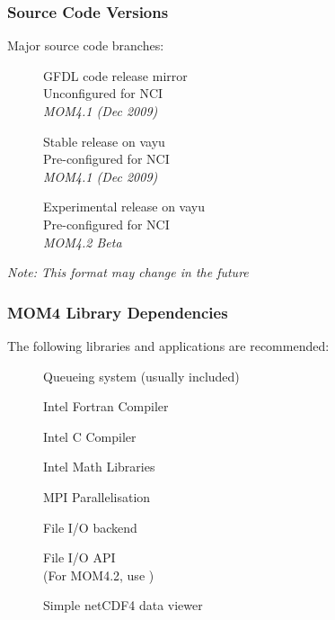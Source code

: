 \documentclass{beamer}
\begin{document}
\begin{frame}[fragile]
    \frametitle{Source Code Versions}
    
    Major source code branches:
    \begin{description}
        \item[] GFDL code release mirror\\
                                     Unconfigured for NCI\\
                                     \textit{MOM4.1 (Dec 2009)}
        \item[] Stable release on vayu\\
                                         Pre-configured for NCI\\
                                         \textit{MOM4.1 (Dec 2009)}
        \item[] Experimental release on vayu\\
                                                 Pre-configured for NCI\\
                                                 \textit{MOM4.2 Beta}
    \end{description}

    \textit{Note: This format may change in the future}
\end{frame}

\begin{frame}[fragile]
    \frametitle{MOM4 Library Dependencies}

    The following libraries and applications are recommended:
    \begin{description}
        \item[] Queueing system (usually included)
        \item[] Intel Fortran Compiler
        \item[] Intel C Compiler
        \item[] Intel Math Libraries
        \item[] MPI Parallelisation
        \item[] File I/O backend
        \item[] File I/O API \\
            (For MOM4.2, use )
        \item[] Simple netCDF4 data viewer
    \end{description}
\end{frame}
\end{document}

